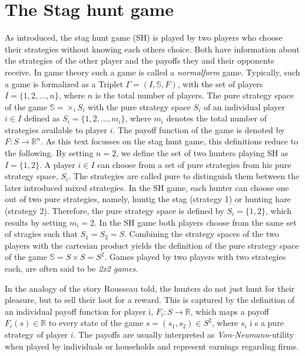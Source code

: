 \documentclass[11pt]{article}
\newcommand{\realnumb}{\mathbb{R}}
\begin{document}
\section{The Stag hunt game}
\label{sec:traditional}
As introduced, the stag hunt game (SH) is played by two players who choose their
strategies without knowing each others choice.
Both have information about the strategies of the
other player and the payoffs they and their opponents receive. In game theory
such a game is called a \textit{normalform} game. Typically, such a game is
formalized as a Triplet $\Gamma = (I,\mathbb{S},F)$, with the set of players 
$I=\{1,2,...,n\}$, where $n$ is the total number of players.
The pure strategy space of the game $\mathbb{S} = \times_i S_i$
with the pure strategy space $S_i$ of an individual player 
$i \in I$ defined as $S_i = \{1,2,...,m_i\}$, where $m_i$ denotes the total
number of strategies available to player $i$. The payoff function of the game
is denoted by $F: S \rightarrow \realnumb^n$.
As this text focusses on the stag hunt game, this definitions reduce to the 
following.
By setting $n=2$, we define the set of two hunters playing SH as $I=\{1,2\}$. A 
player $i \in I$  can choose from a set of pure strategies from his 
pure strategy space, $S_i$. The strategies are called pure to distinguish
them between the later introduced mixed strategies. 
In the SH game, each hunter can choose one out of two pure strategies, namely, 
huntig the stag (strategy 1) or hunting hare (strategy 2).
Therefore, the pure strategy space is defined by $S_i = \{1,2\}$, which results
by setting $m_i=2$. In the SH game both players choose from
the same set of stragies such that $S_1 =S_2=S$. Combining the strategy spaces
of the two players with the cartesian product
yields the definition of the pure strategy space of the game
$\mathbb{S}= S \times S = S^2$. Games played by two players with two strategies
each, are often said to be \textit{2x2 games}.

In the analogy of the story Rousseau told, the hunters do not just hunt
for their pleasure, but to sell their loot for a reward. 
This is captured by the definition of an individual payoff function for player
i, $F_i:S \rightarrow \realnumb$, which maps a payoff $F_i(s) \in \realnumb$ 
to every state of the game $s=(s_1,s_2) \in S^2$, where $s_i$ i s a pure
strategy of player $i$.
The payoffs are usually interpreted as \textit{Von-Neumann}-utility when 
played by individuals or households and represent earnings regarding firms. 
\end{document}
